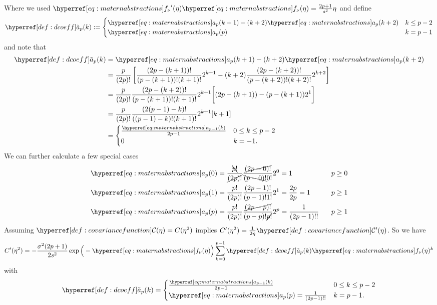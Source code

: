 Where we used \(\mf'(\lr)\mf(\lr) = \tfrac{2p+1}{s^2}\lr\) and define
\begin{equation}\label{def: dcoeff}
	\dcoeff(k):= \begin{cases}
		\mcoeff(k+1) - (k+2)\mcoeff(k+2) & k\le p-2\\
		\mcoeff(p) & k = p-1
	\end{cases}
\end{equation}
and note that
\begin{align}
	\nonumber
	\dcoeff(k)
	&= \mcoeff(k+1) - (k+2)\mcoeff(k+2)\\
	\nonumber
	&= \frac{p}{(2p)!}\left[
		\frac{(2p-(k+1))!}{(p-(k+1))!(k+1)!}2^{k+1}
		- (k+2)\frac{(2p-(k+2))!}{(p-(k+2))!(k+2)!}2^{k+2}
	\right]\\
	\nonumber
	&= \frac{p}{(2p)!}\frac{(2p - (k+2))!}{(p-(k+1))!(k+1)!}2^{k+1}
	\bigg[(2p-(k+1))- (p-(k+1))2^1\bigg]\\
	\nonumber
	&= \frac{p}{(2p)!}\frac{(2(p-1) -k)!}{((p-1)-k)!(k+1)!}2^{k+1}[k+1]\\
	\label{eq: dcoeff(k)}
	&= \begin{cases}
		\frac{\mcoeff[p-1](k)}{2p-1} & 0 \le k \le p-2\\
		0 & k=-1.
	\end{cases}
\end{align}
We can further calculate a few special cases
\begin{align}
	\label{eq: mcoeff 0}
	\mcoeff(0)
	&= \frac{\bcancel{p!}}{\cancel{(2p)!}}\frac{\cancel{(2p-0)!}}{\bcancel{(p-0)!}0!}2^0
	= 1
	\qquad
	&& p\ge 0\\
	\label{eq: mcoeff 1}
	\mcoeff(1)
	&= \frac{p!}{(2p)!}\frac{(2p-1)!}{(p-1)!1!}2^1 = \frac{2p}{2p} = 1 
	\qquad
	&& p\ge 1\\
	\mcoeff(p)
	\label{eq: mcoeff p}
	&= \frac{p!}{(2p)!}\frac{\cancel{(2p-p)!}}{(p-p)!\cancel{p!}}2^p
	= \frac{1}{(2p-1)!!}
	&& p \ge 1
\end{align}
%
Assuming \(\C(\lr) = \sqC(\lr^2)\) implies \(\sqC'(\lr^2) = \frac1{2\lr}\C'(\lr)\).
So we have
\begin{equation*}
	\sqC'(\lr^2)
	=-\frac{\sigma^2(2p+1)}{2s^2}
	\exp\Big(-\mf(\lr)\Big)\sum_{k=0}^{p-1} \dcoeff(k)\mf(\lr)^k
\end{equation*}
with
\begin{equation*}
	\dcoeff(k) = \begin{cases}
		\frac{\mcoeff[p-1](k)}{2p-1} & 0 \le k \le p-2\\
		\mcoeff(p) = \frac{1}{(2p-1)!!} & k=p-1.
	\end{cases}
\end{equation*}

